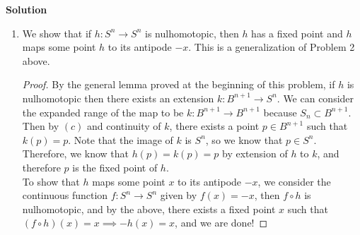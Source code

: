 \documentclass[12pt]{article}
\newcounter{AnswerCounter}
\newcounter{SubAnswerCounter}
\newenvironment{answer}[0]{
  \setcounter{SubAnswerCounter}{1}
  \bigskip
  \textbf{Solution \arabic{AnswerCounter}}
  \\
  \begin{small}
}{
  \end{small}
  \stepcounter{AnswerCounter}
}
\begin{document}
\begin{answer}[Page 353, \#4]
\begin{enumerate}
\begin{proof}
Then note that $x \in Q$ implies that all entries of $x$ are non-negative and at least one is positive (because the origin is NOT contained in $S^n$). Now, $T(x)$ must all be a vector with all positive entries. As a result, the map $x \to \frac{T(x)}{||T(x)||}$ is a continuous map of $Q$ to itself. Therefore, by $(d)$, there exists $x_0 \in Q$ such that:
$$
T(x_0) = ||T(x_0)||x_0
$$
So that $T$ (and therefore the matrix $A$) has the positive, real eigenvalue $||T(x_0)||$. 
\end{proof}
\item We show that if $h: S^n \to S^n$ is nulhomotopic, then $h$ has a fixed point and $h$ maps some point $h$ to its antipode $-x$. This is a generalization of Problem 2 above. 
\begin{proof}
By the general lemma proved at the beginning of this problem, if $h$ is nulhomotopic then there exists an extension $k: B^{n+1} \to S^n$. We can consider the expanded range of the map to be $k: B^{n+1} \to B^{n+1}$ because $S_n \subset B^{n+1}$. Then by $(c)$ and continuity of $k$, there exists a point $p \in B^{n+1}$ such that $k(p) = p$. Note that the image of $k$ is $S^n$, so we know that $p \in S^n$. Therefore, we know that $h(p) = k(p) = p$ by extension of $h$ to $k$, and therefore $p$ is the fixed point of $h$.\\

To show that $h$ maps some point $x$ to its antipode $-x$, we consider the continuous function $f: S^n \to S^n$ given by $f(x) = -x$, then $f \circ h$ is nulhomotopic, and by the above, there exists a fixed point $x$ such that $(f\circ h)(x) = x \implies -h(x) = x$, and we are done! 
\end{proof}
\end{enumerate}
\end{answer}
\end{document}
